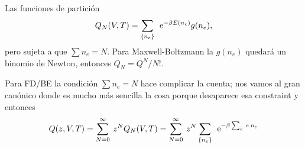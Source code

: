 \documentclass[10pt,oneside]{CBFT_book}
\begin{document}
Las funciones de partición 
\[
	Q_N(V,T) = \sum_{ \{n_e\} } \: \:\mathrm{e}^{ -\beta E(n_e) } g(n_e),
\]
pero sujeta a que $ \sum n_e = N $. Para Maxwell-Boltzmann la $ g(n_e) $ quedará un binomio de Newton,
entonces $ Q_N = Q^N / N! $.

Para FD/BE la condición $ \sum n_e = N $ hace complicar la cuenta; nos vamos al gran canónico donde
es mucho más sencilla la cosa porque desaparece esa constraint y entonces
\[
	Q(z,V,T) = \sum_{N=0}^\infty \: z^N Q_N(V,T) =
	\sum_{N=0}^\infty \: z^N \sum_{ \{n_e\} } \: \:\mathrm{e}^{ -\beta \sum_e \: e \: n_e }
\]


\end{document}
